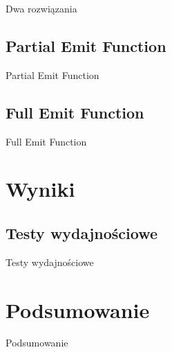 \documentclass{beamer}
\begin{document}
\begin{frame}{Dwa rozwiązania}
\end{frame}


\subsection{Partial Emit Function}

\begin{frame}{Partial Emit Function}
\end{frame}


\subsection{Full Emit Function}

\begin{frame}{Full Emit Function}
\end{frame}




\section{Wyniki}

\subsection{Testy wydajnościowe}

\begin{frame}{Testy wydajnościowe}
\end{frame}


\section*{Podsumowanie}

\begin{frame}{Podsumowanie}

\end{frame}
\end{document}
